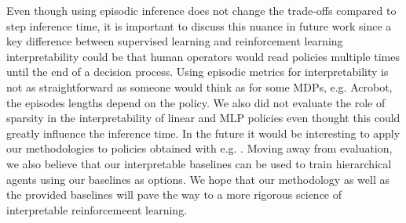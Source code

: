 Even though using episodic inference does not change the trade-offs compared to step inference time, it is important to discuss this nuance in future work since a key difference between supervised learning and reinforcement learning interpretability could be that human operators would read policies multiple times until the end of a decision process.
Using episodic metrics for interpretability is not as straightforward as someone would think as for some MDPs, e.g. Acrobot, the episodes lengths depend on the policy.
We also did not evaluate the role of sparsity in the interpretability of linear and MLP policies even thought this could greatly influence the inference time.
In the future it would be interesting to apply our methodologies to policies obtained with e.g. \cite{sparsity}.
Moving away from evaluation, we also believe that our interpretable baselines can be used to train hierarchical agents \cite{hierarchical} using our baselines as options.
We hope that our methodology as well as the provided baselines will pave the way to a more rigorous science of interpretable reinforcemeent learning.

